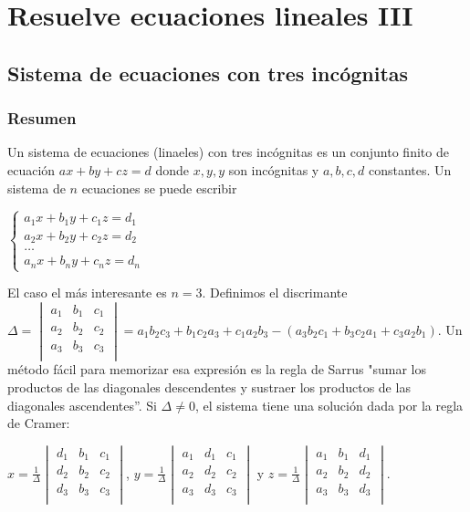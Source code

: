 \chapter{Resuelve ecuaciones lineales III}

\section{Sistema de ecuaciones con tres incógnitas}

\subsection*{Resumen}

Un sistema de ecuaciones (linaeles) con tres incógnitas es un conjunto finito
de ecuación $ax + by + cz = d$ donde $x, y, y$ son incógnitas y $a,b,c,d$
constantes. Un sistema de $n$ ecuaciones se puede escribir

$\left\{
\begin{aligned}
  a_1 x + b_1 y + c_1 z = d_1 \\
  a_2 x + b_2 y + c_2 z = d_2 \\
  \ldots \\
  a_n x + b_n y + c_n z = d_n  
\end{aligned}\right.$

El caso el más interesante es $n = 3$.
Definimos el discrimante $\Delta = \begin{vmatrix}
  a_1 & b_1 & c_1 \\
  a_2 & b_2 & c_2 \\
  a_3 & b_3 & c_3 \\
 \end{vmatrix} = {{a_1 b_2 c_3} + {b_1 c_2 a_3} + {c_1 a_2 b_3}} - \left( 
{{a_3 b_2 c_1} + {b_3 c_2 a_1} + {c_3 a_2 b_1}}
\right)$. Un método fácil para memorizar esa expresión es la regla de Sarrus
"sumar los productos de las diagonales descendentes y sustraer los productos de las diagonales ascendentes''. Si $\Delta \neq 0$, el sistema tiene una solución
dada por la regla de Cramer:

$x = \frac{1}{\Delta} \begin{vmatrix}
  d_1 & b_1 & c_1 \\
  d_2 & b_2 & c_2 \\
  d_3 & b_3 & c_3 \\
 \end{vmatrix}$, $y = \frac{1}{\Delta} \begin{vmatrix}
  a_1 & d_1 & c_1 \\
  a_2 & d_2 & c_2 \\
  a_3 & d_3 & c_3 \\
 \end{vmatrix}$ y $z = \frac{1}{\Delta} \begin{vmatrix}
  a_1 & b_1 & d_1 \\
  a_2 & b_2 & d_2 \\
  a_3 & b_3 & d_3 \\
 \end{vmatrix}$.

